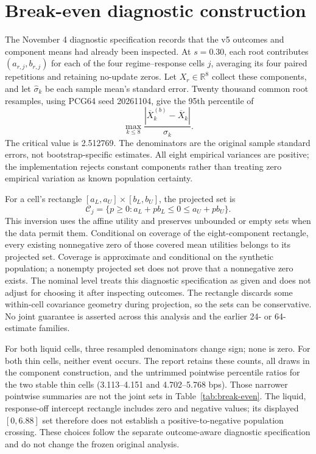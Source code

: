 \documentclass[10pt,letterpaper]{article}
\begin{document}
\section{Break-even diagnostic construction}\label{app:break-even}
The November 4 diagnostic specification records that the v5 outcomes and component means had already been inspected. At $s=0.30$, each root contributes $(a_{r,j},b_{r,j})$ for each of the four regime--response cells $j$, averaging its four paired repetitions and retaining no-update zeros. Let $X_r\in\mathbb R^8$ collect these components, and let $\widehat\sigma_k$ be each sample mean's standard error. Twenty thousand common root resamples, using PCG64 seed 20261104, give the 95th percentile of
\[
\max_{k\leq8}\frac{|\overline X_k^{(b)}-\overline X_k|}{\widehat\sigma_k}.
\]
The critical value is 2.512769. The denominators are the original sample standard errors, not bootstrap-specific estimates. All eight empirical variances are positive; the implementation rejects constant components rather than treating zero empirical variation as known population certainty.

For a cell's rectangle $[a_L,a_U]\times[b_L,b_U]$, the projected set is
\[
\mathcal C_j=\{p\geq0:a_L+p b_L\leq0\leq a_U+p b_U\}.
\]
This inversion uses the affine utility and preserves unbounded or empty sets when the data permit them. Conditional on coverage of the eight-component rectangle, every existing nonnegative zero of those covered mean utilities belongs to its projected set. Coverage is approximate and conditional on the synthetic population; a nonempty projected set does not prove that a nonnegative zero exists. The nominal level treats this diagnostic specification as given and does not adjust for choosing it after inspecting outcomes. The rectangle discards some within-cell covariance geometry during projection, so the sets can be conservative. No joint guarantee is asserted across this analysis and the earlier 24- or 64-estimate families.

For both liquid cells, three resampled denominators change sign; none is zero. For both thin cells, neither event occurs. The report retains these counts, all draws in the component construction, and the untrimmed pointwise percentile ratios for the two stable thin cells (3.113--4.151 and 4.702--5.768 bps). Those narrower pointwise summaries are not the joint sets in Table~\ref{tab:break-even}. The liquid, response-off intercept rectangle includes zero and negative values; its displayed $[0,6.88]$ set therefore does not establish a positive-to-negative population crossing. These choices follow the separate outcome-aware diagnostic specification and do not change the frozen original analysis.
\end{document}
